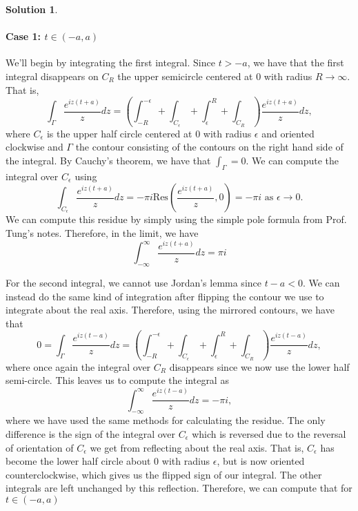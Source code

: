 \documentclass[12pt]{article}
\newcommand{\Res}{\text{Res}}
\theoremstyle{definition}
\newtheorem{sol}{Solution}
\theoremstyle{remark}
\begin{document}
\begin{sol}
    \paragraph{Case 1: $t\in(-a, a)$}
    
    We'll begin by integrating the first integral. Since $ t > -a$, we have that the first integral disappears on $C_R$ the upper semicircle centered at $0$ with radius $R\to \infty$. That is,
    \begin{equation}
        \int_\Gamma \frac{e^{i z (t+a)}}{z} dz = \left(\int_{-R}^{-\epsilon} + \int_{C_\epsilon} + \int_{\epsilon}^{R} + \int_{C_R}\right) \frac{e^{i z (t+a)}}{z} dz, 
    \end{equation}
    where $C_\epsilon$ is the upper half circle centered at 0 with radius $\epsilon$ and oriented clockwise and $\Gamma$ the contour consisting of the contours on the right hand side of the integral. By Cauchy's theorem, we have that $\int_\Gamma = 0$. We can compute the integral over $C_\epsilon$ using 
    \begin{equation}
        \int_{C_\epsilon}\frac{e^{i z (t+a)}}{z} dz = -\pi i \Res\left(\frac{e^{i z (t+a)}}{z},0\right) = -\pi i\text{ as  } \epsilon \to 0.
    \end{equation}
    We can compute this residue by simply using the simple pole formula from Prof. Tung's notes. Therefore, in the limit, we have 
    \begin{equation}
        \int_{-\infty}^{\infty}\frac{e^{i z (t+a)}}{z} dz = \pi i
    \end{equation}

    For the second integral, we cannot use Jordan's lemma since $t-a < 0$. We can instead do the same kind of integration after flipping the contour we use to integrate about the real axis. Therefore, using the mirrored contours, we have that 
    \begin{equation}
    0 = \int_\Gamma \frac{e^{i z (t-a)}}{z} dz  = \left(\int_{-R}^{-\epsilon} + \int_{C_\epsilon} + \int_{\epsilon}^{R} + \int_{C_R}\right) \frac{e^{i z (t-a)}}{z} dz,
    \end{equation}
    where once again the integral over $C_R$ disappears since we now use the lower half semi-circle. This leaves us to compute the integral as 
    \begin{equation}
        \int_{-\infty}^{\infty} \frac{e^{i z (t-a)}}{z} dz = -\pi i,
    \end{equation}
    where we have used the same methods for calculating the residue. The only difference is the sign of the integral over $C_\epsilon$ which is reversed due to the reversal of orientation of $C_\epsilon$ we get from reflecting about the real axis. That is, $C_\epsilon$ has become the lower half circle about 0 with radius $\epsilon$, but is now oriented counterclockwise, which gives us the flipped sign of our integral. The other integrals are left unchanged by this reflection. Therefore, we can compute that for $t\in (-a,a )$


\end{sol}
\end{document}

